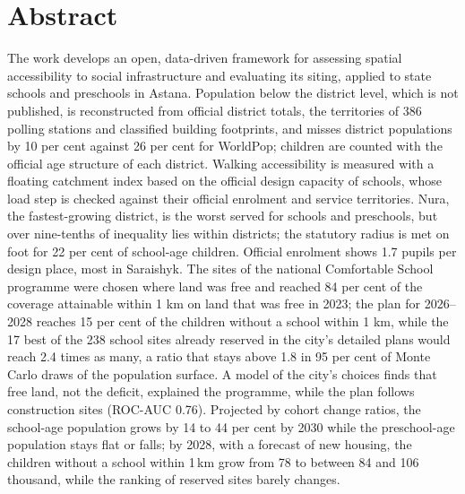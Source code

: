 \chapter*{Abstract}

The work develops an open, data-driven framework for assessing spatial accessibility to social infrastructure and evaluating its siting, applied to state schools and preschools in Astana. Population below the district level, which is not published, is reconstructed from official district totals, the territories of 386 polling stations and classified building footprints, and misses district populations by 10 per cent against 26 per cent for WorldPop; children are counted with the official age structure of each district. Walking accessibility is measured with a floating catchment index based on the official design capacity of schools, whose load step is checked against their official enrolment and service territories. Nura, the fastest-growing district, is the worst served for schools and preschools, but over nine-tenths of inequality lies within districts; the statutory radius is met on foot for 22 per cent of school-age children. Official enrolment shows 1.7 pupils per design place, most in Saraishyk. The sites of the national Comfortable School programme were chosen where land was free and reached 84 per cent of the coverage attainable within 1 km on land that was free in 2023; the plan for 2026--2028 reaches 15 per cent of the children without a school within 1 km, while the 17 best of the 238 school sites already reserved in the city's detailed plans would reach 2.4 times as many, a ratio that stays above 1.8 in 95 per cent of Monte Carlo draws of the population surface. A model of the city's choices finds that free land, not the deficit, explained the programme, while the plan follows construction sites (ROC-AUC 0.76). Projected by cohort change ratios, the school-age population grows by 14 to 44 per cent by 2030 while the preschool-age population stays flat or falls; by 2028, with a forecast of new housing, the children without a school within 1\,km grow from 78 to between 84 and 106 thousand, while the ranking of reserved sites barely changes.

